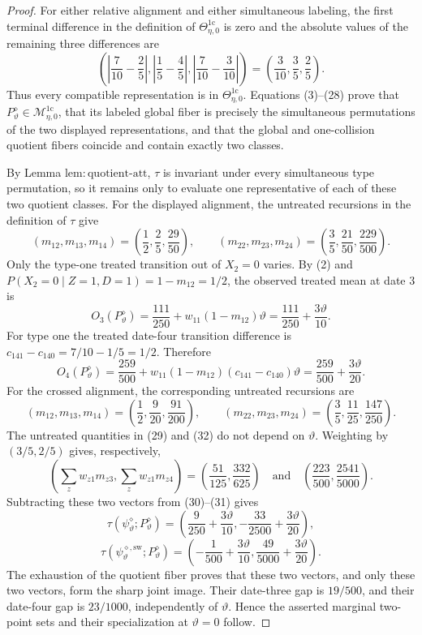 \documentclass{article}
\begin{document}
\begin{proof}
For either relative alignment and either simultaneous labeling, the first terminal difference in the definition of \(\Theta_{\eta,0}^{1\mathrm c}\) is zero and the absolute values of the remaining three differences are
\[
 \left(\left|\frac7{10}-\frac25\right|,
 \left|\frac15-\frac45\right|,
 \left|\frac7{10}-\frac3{10}\right|\right)
 =\left(\frac3{10},\frac35,\frac25\right).
 \tag{28}
\]
Thus every compatible representation is in \(\Theta_{\eta,0}^{1\mathrm c}\). Equations (3)--(28) prove that \(P^{\diamond}_{\vartheta}\in\mathcal M_{\eta,0}^{1\mathrm c}\), that its labeled global fiber is precisely the simultaneous permutations of the two displayed representations, and that the global and one-collision quotient fibers coincide and contain exactly two classes.

By Lemma \(\mathrm{lem{:}quotient\text{-}att}\), \(\tau\) is invariant under every simultaneous type permutation, so it remains only to evaluate one representative of each of these two quotient classes. For the displayed alignment, the untreated recursions in the definition of \(\tau\) give
\[
 (m_{12},m_{13},m_{14})=\left(\frac12,\frac25,\frac{29}{50}\right),
 \qquad
 (m_{22},m_{23},m_{24})=\left(\frac35,\frac{21}{50},\frac{229}{500}\right).
 \tag{29}
\]
Only the type-one treated transition out of \(X_2=0\) varies. By (2) and \(P(X_2=0\mid Z=1,D=1)=1-m_{12}=1/2\), the observed treated mean at date \(3\) is
\[
 O_3(P^{\diamond}_{\vartheta})
 =\frac{111}{250}+w_{11}(1-m_{12})\vartheta
 =\frac{111}{250}+\frac{3\vartheta}{10}.
 \tag{30}
\]
For type one the treated date-four transition difference is \(c_{141}-c_{140}=7/10-1/5=1/2\). Therefore
\[
 O_4(P^{\diamond}_{\vartheta})
 =\frac{259}{500}+w_{11}(1-m_{12})(c_{141}-c_{140})\vartheta
 =\frac{259}{500}+\frac{3\vartheta}{20}.
 \tag{31}
\]
For the crossed alignment, the corresponding untreated recursions are
\[
 (m_{12},m_{13},m_{14})=\left(\frac12,\frac9{20},\frac{91}{200}\right),
 \qquad
 (m_{22},m_{23},m_{24})=\left(\frac35,\frac{11}{25},\frac{147}{250}\right).
 \tag{32}
\]
The untreated quantities in (29) and (32) do not depend on \(\vartheta\). Weighting by \((3/5,2/5)\) gives, respectively,
\[
 \left(\sum_z w_{z1}m_{z3},\sum_z w_{z1}m_{z4}\right)
 =\left(\frac{51}{125},\frac{332}{625}\right)
 \quad\text{and}\quad
 \left(\frac{223}{500},\frac{2541}{5000}\right).
 \tag{33}
\]
Subtracting these two vectors from (30)--(31) gives
\[
 \tau(\psi^{\diamond}_{\vartheta};P^{\diamond}_{\vartheta})
 =\left(\frac9{250}+\frac{3\vartheta}{10},
 -\frac{33}{2500}+\frac{3\vartheta}{20}\right),
 \tag{34}
\]
\[
 \tau(\psi^{\diamond,\mathrm{sw}}_{\vartheta};P^{\diamond}_{\vartheta})
 =\left(-\frac1{500}+\frac{3\vartheta}{10},
 \frac{49}{5000}+\frac{3\vartheta}{20}\right).
 \tag{35}
\]
The exhaustion of the quotient fiber proves that these two vectors, and only these two vectors, form the sharp joint image. Their date-three gap is \(19/500\), and their date-four gap is \(23/1000\), independently of \(\vartheta\). Hence the asserted marginal two-point sets and their specialization at \(\vartheta=0\) follow.


\end{proof}
\end{document}
